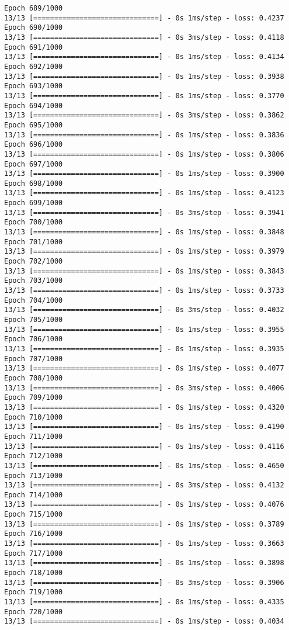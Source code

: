 \documentclass[11pt]{article}
\begin{document}
\begin{Verbatim}[commandchars=\\\{\}]
Epoch 689/1000
13/13 [==============================] - 0s 1ms/step - loss: 0.4237
Epoch 690/1000
13/13 [==============================] - 0s 3ms/step - loss: 0.4118
Epoch 691/1000
13/13 [==============================] - 0s 1ms/step - loss: 0.4134
Epoch 692/1000
13/13 [==============================] - 0s 1ms/step - loss: 0.3938
Epoch 693/1000
13/13 [==============================] - 0s 1ms/step - loss: 0.3770
Epoch 694/1000
13/13 [==============================] - 0s 3ms/step - loss: 0.3862
Epoch 695/1000
13/13 [==============================] - 0s 1ms/step - loss: 0.3836
Epoch 696/1000
13/13 [==============================] - 0s 1ms/step - loss: 0.3806
Epoch 697/1000
13/13 [==============================] - 0s 1ms/step - loss: 0.3900
Epoch 698/1000
13/13 [==============================] - 0s 1ms/step - loss: 0.4123
Epoch 699/1000
13/13 [==============================] - 0s 3ms/step - loss: 0.3941
Epoch 700/1000
13/13 [==============================] - 0s 1ms/step - loss: 0.3848
Epoch 701/1000
13/13 [==============================] - 0s 1ms/step - loss: 0.3979
Epoch 702/1000
13/13 [==============================] - 0s 1ms/step - loss: 0.3843
Epoch 703/1000
13/13 [==============================] - 0s 1ms/step - loss: 0.3733
Epoch 704/1000
13/13 [==============================] - 0s 3ms/step - loss: 0.4032
Epoch 705/1000
13/13 [==============================] - 0s 1ms/step - loss: 0.3955
Epoch 706/1000
13/13 [==============================] - 0s 1ms/step - loss: 0.3935
Epoch 707/1000
13/13 [==============================] - 0s 1ms/step - loss: 0.4077
Epoch 708/1000
13/13 [==============================] - 0s 3ms/step - loss: 0.4006
Epoch 709/1000
13/13 [==============================] - 0s 1ms/step - loss: 0.4320
Epoch 710/1000
13/13 [==============================] - 0s 1ms/step - loss: 0.4190
Epoch 711/1000
13/13 [==============================] - 0s 1ms/step - loss: 0.4116
Epoch 712/1000
13/13 [==============================] - 0s 1ms/step - loss: 0.4650
Epoch 713/1000
13/13 [==============================] - 0s 3ms/step - loss: 0.4132
Epoch 714/1000
13/13 [==============================] - 0s 1ms/step - loss: 0.4076
Epoch 715/1000
13/13 [==============================] - 0s 1ms/step - loss: 0.3789
Epoch 716/1000
13/13 [==============================] - 0s 1ms/step - loss: 0.3663
Epoch 717/1000
13/13 [==============================] - 0s 1ms/step - loss: 0.3898
Epoch 718/1000
13/13 [==============================] - 0s 3ms/step - loss: 0.3906
Epoch 719/1000
13/13 [==============================] - 0s 1ms/step - loss: 0.4335
Epoch 720/1000
13/13 [==============================] - 0s 1ms/step - loss: 0.4034

\end{Verbatim}
\end{document}
